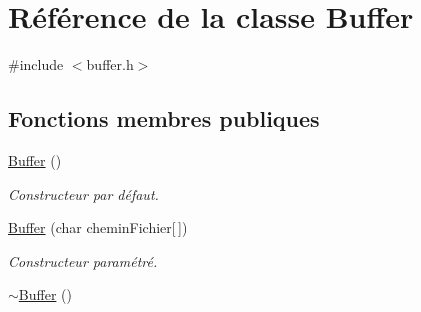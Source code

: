 \hypertarget{classBuffer}{
\section{Référence de la classe Buffer}
\label{classBuffer}
}


{\ttfamily \#include $<$buffer.h$>$}

\subsection*{Fonctions membres publiques}
\begin{DoxyCompactItemize}
\item 
\hypertarget{classBuffer_ae7ef2cd201190fde551dcb902627112b}{
\hyperlink{classBuffer_ae7ef2cd201190fde551dcb902627112b}{Buffer} ()}
\label{classBuffer_ae7ef2cd201190fde551dcb902627112b}

\begin{DoxyCompactList}\small\item\em Constructeur par défaut. \item\end{DoxyCompactList}\item 
\hyperlink{classBuffer_a968f9c9b50fe02f7d76de200f78507b0}{Buffer} (char cheminFichier\mbox{[}$\,$\mbox{]})
\begin{DoxyCompactList}\small\item\em Constructeur paramétré. \item\end{DoxyCompactList}\item 
\hypertarget{classBuffer_a59b8743e4a5f731bdd0c4185c9ef263b}{
\hyperlink{classBuffer_a59b8743e4a5f731bdd0c4185c9ef263b}{$\sim$Buffer} ()}
\label{classBuffer_a59b8743e4a5f731bdd0c4185c9ef263b}


\end{DoxyCompactItemize}
